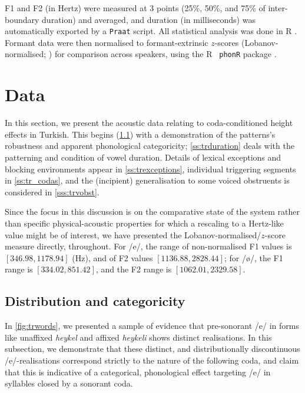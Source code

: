 F1 and F2 (in Hertz) were measured at 3 points (25\%, 50\%, and 75\% of inter-boundary duration) and averaged, and duration (in milliseconds) was automatically exported by a \texttt{Praat} script. All statistical analysis was done in R \citep{R}. Formant data were then normalised to formant-extrinsic $z$-scores (Lobanov-normalised; \citealt{Lobanov1971, Adank2004}) for comparison across speakers, using the R \texttt{ phonR} package \citep{phonR}.

\section{Data}\label{s:trdata}

In this section, we present the acoustic data relating to coda-conditioned height effects in Turkish. This begins (\cref{ss:distrib}) with a demonstration of the patterns's robustness and apparent phonological categoricity; \cref{ss:trduration} deals with the patterning and condition of vowel duration. Details of lexical exceptions and blocking environments appear in  \cref{ss:trexceptions}, individual triggering segments in \cref{ss:tr_codas}, and the (incipient) generalisation to some voiced obstruents is considered in \cref{sss:trvobst}.

Since the focus in this discussion is on the comparative state of the system rather than specific physical-acoustic properties for which a rescaling to a Hertz-like value might be of interest, we have presented the Lobanov-normalised/$z$-score measure directly, throughout. For /e/, the range of non-normalised F1 values is $[346.98,1178.94]$ (Hz), and of F2 values $[1136.88,2828.44]$; for /ø/, the F1 range is $[334.02, 851.42]$, and the F2 range is $[1062.01, 2329.58]$.

\subsection{Distribution and categoricity}\label{ss:distrib}

In \cref{fig:trwords}, we presented a sample of evidence that pre-sonorant /e/ in forms like unaffixed \emph{heykel} and affixed \emph{heykeli} shows distinct realisations. In this subsection, we demonstrate that these distinct, and distributionally discontinuous /e/-realisations correspond strictly to the nature of the following coda, and claim that this is indicative of a categorical, phonological effect targeting /e/ in syllables closed by a sonorant coda.

